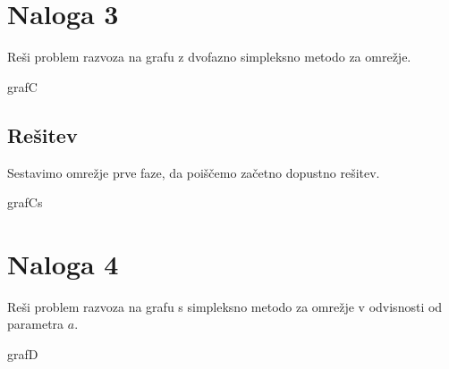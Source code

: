 \documentclass[14pt]{extarticle}
\begin{document}
\clearpage
\section*{Naloga 3}

Reši problem razvoza na grafu
z dvofazno simpleksno metodo za omrežje.

\begin{razvoz}[scale=0.9]{grafC}
\end{razvoz}

\subsection*{Rešitev}

Sestavimo omrežje prve faze, da poiščemo začetno dopustno rešitev.

\begin{razvoz}[scale=0.9]{grafCs}
\end{razvoz}

\clearpage
\section*{Naloga 4}

Reši problem razvoza na grafu s simpleksno metodo za omrežje
v odvisnosti od parametra $a$.

\begin{razvoz}{grafD}
\end{razvoz}
\end{document}

